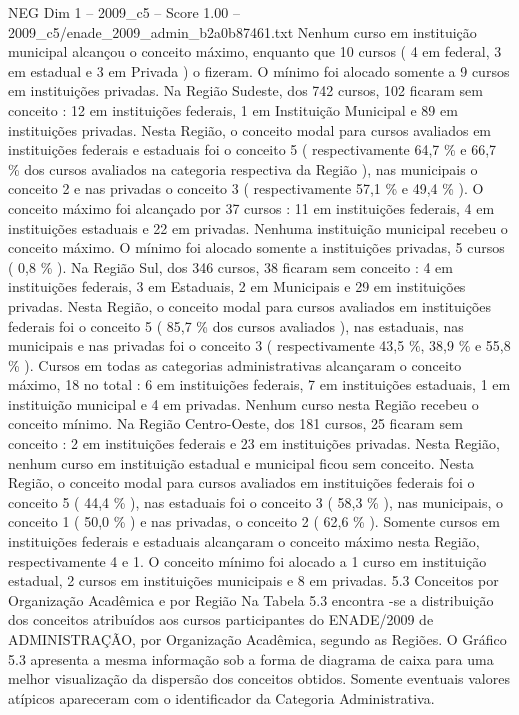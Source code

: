 \begin{textsample}{NEG Dim 1 – 2009\_c5 – Score 1.00 – 2009\_c5/enade\_2009\_admin\_b2a0b87461.txt}
Nenhum curso em instituição municipal alcançou o conceito máximo, enquanto que 10 cursos ( 4 em federal, 3 em estadual e 3 em Privada ) o fizeram.
O mínimo foi alocado somente a 9 cursos em instituições privadas.
Na Região Sudeste, dos 742 cursos, 102 ficaram sem conceito : 12 em instituições federais, 1 em Instituição Municipal e 89 em instituições privadas.
Nesta Região, o conceito modal para cursos avaliados em instituições federais e estaduais foi o conceito 5 ( respectivamente 64,7 \% e 66,7 \% dos cursos avaliados na categoria respectiva da Região ), nas municipais o conceito 2 e nas privadas o conceito 3 ( respectivamente 57,1 \% e 49,4 \% ).
O conceito máximo foi alcançado por 37 cursos : 11 em instituições federais, 4 em instituições estaduais e 22 em privadas.
Nenhuma instituição municipal recebeu o conceito máximo.
O mínimo foi alocado somente a instituições privadas, 5 cursos ( 0,8 \% ).
Na Região Sul, dos 346 cursos, 38 ficaram sem conceito : 4 em instituições federais, 3 em Estaduais, 2 em Municipais e 29 em instituições privadas.
Nesta Região, o conceito modal para cursos avaliados em instituições federais foi o conceito 5 ( 85,7 \% dos cursos avaliados ), nas estaduais, nas municipais e nas privadas foi o conceito 3 ( respectivamente 43,5 \%, 38,9 \% e 55,8 \% ).
Cursos em todas as categorias administrativas alcançaram o conceito máximo, 18 no total : 6 em instituições federais, 7 em instituições estaduais, 1 em instituição municipal e 4 em privadas.
Nenhum curso nesta Região recebeu o conceito mínimo.
Na Região Centro-Oeste, dos 181 cursos, 25 ficaram sem conceito : 2 em instituições federais e 23 em instituições privadas.
Nesta Região, nenhum curso em instituição estadual e municipal ficou sem conceito.
Nesta Região, o conceito modal para cursos avaliados em instituições federais foi o conceito 5 ( 44,4 \% ), nas estaduais foi o conceito 3 ( 58,3 \% ), nas municipais, o conceito 1 ( 50,0 \% ) e nas privadas, o conceito 2 ( 62,6 \% ).
Somente cursos em instituições federais e estaduais alcançaram o conceito máximo nesta Região, respectivamente 4 e 1.
O conceito mínimo foi alocado a 1 curso em instituição estadual, 2 cursos em instituições municipais e 8 em privadas. 5.3 Conceitos por Organização Acadêmica e por Região Na Tabela 5.3 encontra -se a distribuição dos conceitos atribuídos aos cursos participantes do ENADE/2009 de ADMINISTRAÇÃO, por Organização Acadêmica, segundo as Regiões.
O Gráfico 5.3 apresenta a mesma informação sob a forma de diagrama de caixa para uma melhor visualização da dispersão dos conceitos obtidos.
Somente eventuais valores atípicos apareceram com o identificador da Categoria Administrativa.

\end{textsample}
